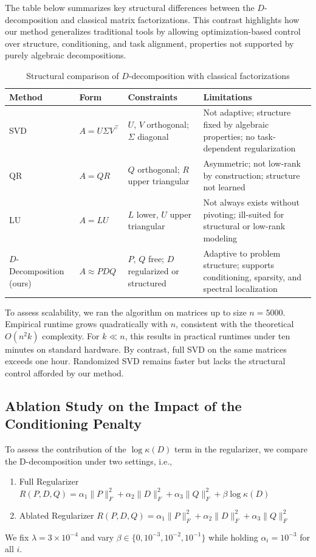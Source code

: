 \documentclass[10pt,a4paper]{article}
\begin{document}
The table below summarizes key structural differences between the $D$-decomposition and classical matrix factorizations. This contrast highlights how our method generalizes traditional tools by allowing optimization-based control over structure, conditioning, and task alignment, properties not supported by purely algebraic decompositions.

\begin{table}[H]
\centering
\caption{Structural comparison of $D$-decomposition with classical factorizations}
\begin{tabular}{|p{3cm}|p{1.5cm}|p{3cm}|p{6.5cm}|}
\hline
\textbf{Method} & \textbf{Form} & \textbf{Constraints} & \textbf{Limitations} \\
\hline
SVD & $A = U \Sigma V^\top$ & $U$, $V$ orthogonal; $\Sigma$ diagonal & Not adaptive; structure fixed by algebraic properties; no task-dependent regularization \\
\hline
QR & $A = QR$ & $Q$ orthogonal; $R$ upper triangular & Asymmetric; not low-rank by construction; structure not learned \\
\hline
LU & $A = LU$ & $L$ lower, $U$ upper triangular & Not always exists without pivoting; ill-suited for structural or low-rank modeling \\
\hline
$D$-Decomposition (ours) & $A \approx P D Q$ & $P$, $Q$ free; $D$ regularized or structured & Adaptive to problem structure; supports conditioning, sparsity, and spectral localization \\
\hline
\end{tabular}
\end{table}
To assess scalability, we ran the algorithm on matrices up to size $n = 5000$. Empirical runtime grows quadratically with $n$, consistent with the theoretical $O(n^2k)$ complexity. For $k \ll n$, this results in practical runtimes under ten minutes on standard hardware. By contrast, full SVD on the same matrices exceeds one hour. Randomized SVD remains faster but lacks the structural control afforded by our method.

\subsection{Ablation Study on the Impact of the Conditioning Penalty}

To assess the contribution of the $\log \kappa(D)$ term in the regularizer, we compare the D-decomposition under two settings, i.e.,
\begin{enumerate}
    \item Full Regularizer $R(P,D,Q) = \alpha_1 \|P\|_F^2 + \alpha_2 \|D\|_F^2 + \alpha_3 \|Q\|_F^2 + \beta \log \kappa(D)$
    \item Ablated Regularizer $R(P,D,Q) = \alpha_1 \|P\|_F^2 + \alpha_2 \|D\|_F^2 + \alpha_3 \|Q\|_F^2$
\end{enumerate}We fix $\lambda = 3 \times 10^{-4}$ and vary $\beta \in \{0, 10^{-3}, 10^{-2}, 10^{-1}\}$ while holding $\alpha_i = 10^{-3}$ for all $i$.
\end{document}
